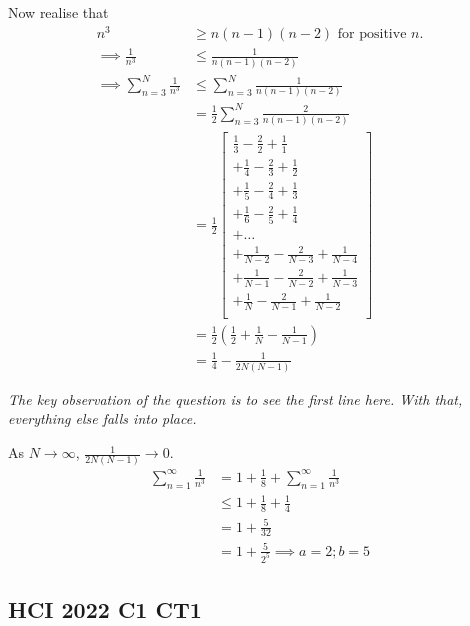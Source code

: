 \documentclass[12pt, a4paper, titlepage]{article}
\begin{document}
Now realise that
\begin{align*}
        n^3 &\ge n(n - 1)(n - 2) \text{ for positive } n. \\
        \implies \frac{1}{n^3} &\leq \frac{1}{n(n - 1)(n - 2)} \\
        \implies \sum_{n = 3}^{N} \frac{1}{n^3} &\leq \sum_{n = 3}^{N} \frac{1}{n(n - 1)(n - 2)} \\
        &= \frac{1}{2} \sum_{n = 3}^{N} \frac{2}{n(n - 1)(n - 2)} \\
        &= \frac{1}{2} \left[
        \begin{array}{c}
            \frac{1}{3} - \frac{2}{2} + \frac{1}{1} \\
            + \frac{1}{4} - \frac{2}{3} + \frac{1}{2} \\
            + \frac{1}{5} - \frac{2}{4} + \frac{1}{3} \\
            + \frac{1}{6} - \frac{2}{5} + \frac{1}{4} \\
            + \dots \\
            + \frac{1}{N - 2} - \frac{2}{N - 3} + \frac{1}{N - 4} \\
            + \frac{1}{N - 1} - \frac{2}{N - 2} + \frac{1}{N - 3} \\
            + \frac{1}{N} - \frac{2}{N - 1} + \frac{1}{N - 2} \\
        \end{array}
        \right] \\
        &= \frac{1}{2}(\frac{1}{2} + \frac{1}{N} - \frac{1}{N - 1}) \\
        &= \frac{1}{4} - \frac{1}{2N(N - 1)}
\end{align*}

\emph{The key observation of the question is to see the first line here. With that, everything else falls into place.}

As $N \rightarrow \infty$, $\frac{1}{2N(N - 1)} \rightarrow 0$.
\begin{align*}
    \sum_{n = 1}^\infty \frac{1}{n^3} &= 1 + \frac{1}{8} + \sum_{n = 1}^\infty \frac{1}{n^3} \\
    &\leq 1 + \frac{1}{8} + \frac{1}{4} \\
    &= 1 + \frac{5}{32} \\
    &= 1 + \frac{5}{2^5} \implies a = 2; b = 5
\end{align*}

\subsection{HCI 2022 C1 CT1}
\end{document}
